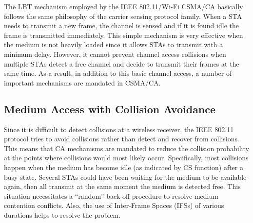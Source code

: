 The LBT mechanism employed by the IEEE 802.11/\mbox{Wi-Fi} CSMA/CA basically follows the same philosophy of the carrier sensing protocol family. When a STA needs to transmit a new frame, the channel is sensed and if it is found idle the frame is transmitted immediately. This simple mechanism is very effective when the medium is not heavily loaded since it allows STAs to transmit with a minimum delay. However, it cannot prevent channel access collisions when multiple STAs detect a free channel and decide to transmit their frames at the same time. As a result, in addition to this basic channel access, a number of important mechanisms are mandated in CSMA/CA.


\subsection{Medium Access with Collision Avoidance}
\label{collision-avoidance}

Since it is difficult to detect collisions at a wireless receiver, the IEEE 802.11 protocol tries to avoid collisions rather than detect and recover from collisions. This means that CA mechanisms are mandated to reduce the collision probability at the points where collisions would most likely occur. Specifically, most collisions happen when the medium has become idle (as indicated by CS function) after a busy state. Several STAs could have been waiting for the medium to be available again, then all transmit at the same moment the medium is detected free. This situation necessitates a ``random'' back-off procedure to resolve medium contention conflicts. Also, the use of Inter-Frame Spaces (IFSs) of various durations helps to resolve the problem. 

